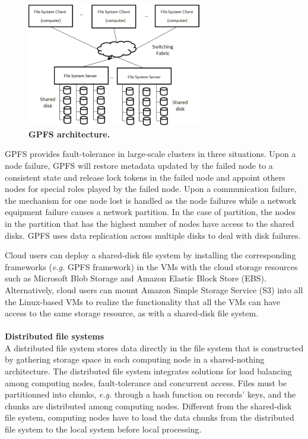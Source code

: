 \begin{figure}
\begin{centering}
\includegraphics[width=3in]{figures/f13}
\par\end{centering}

\caption{\textbf{GPFS architecture. }}
\label{fig:f13} 
\end{figure}

GPFS provides fault-tolerance in large-scale clusters in three
situations. Upon a node failure, GPFS will restore
metadata updated by the failed node to a consistent state and release
lock tokens in the failed node and appoint others nodes for special
roles played by the failed node. Upon a communication
failure, the mechanism for one node lost is handled as the node failures
while a network equipment failure causes a network partition. In the
case of partition, the nodes in the partition that has the highest
number of nodes have access to the shared disks. GPFS uses data
replication across multiple disks to deal with disk failures. 

Cloud users can deploy a shared-disk file system by installing the corresponding
frameworks (\textit{e.g.} GPFS framework) in the VMs with the cloud
storage resources such as Microsoft Blob Storage and Amazon Elastic
Block Store (EBS). Alternatively, cloud users can mount Amazon Simple
Storage Service (S3) into all the Linux-based VMs to realize the
functionality that all the VMs can have access to the same storage
resource, as with a shared-disk file system.\\
\\
\textbf{Distributed file systems}\\
A distributed file system
stores data directly in the file system that is constructed by gathering
storage space in each computing node in a shared-nothing architecture.
The distributed file system integrates solutions for load
balancing among computing nodes, fault-tolerance and concurrent
access. Files must be partitionned into chunks, \textit{e.g.} through a hash
function on records' keys, and the chunks are distributed among
computing nodes.
Different from the shared-disk file system, computing
nodes have to load the data chunks from the distributed file system to the
local system before local processing. 


